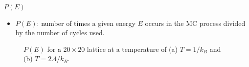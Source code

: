 \documentclass{beamer} %
\begin{document}
\begin{frame}{$P\left(E\right)$}
\begin{itemize}
\item $P(E)$: number of times a given energy $E$ occurs in the MC process divided by the number of cycles used. 
\end{itemize}

\begin{figure}[h]
\begin{center}
\caption{$P(E)$ for a $20\times20$ lattice at a temperature of (a) $T=1/k_{B}$ and (b) $T=2.4/k_{B}$.}
\label{fig:size20pofE}
\end{center}
\end{figure}
\end{frame}
\end{document}
